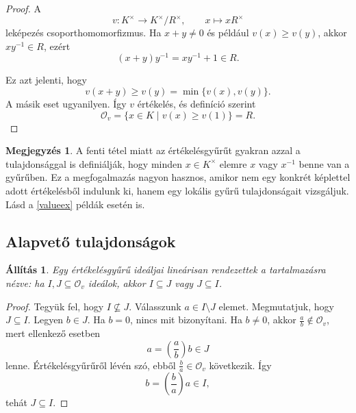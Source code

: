 \documentclass[11pt,a4paper]{article}
\theoremstyle{definition}
\newtheorem{remark}[definition]{Megjegyzés}
\theoremstyle{plain}
\newtheorem{proposition}[definition]{Állítás}
\begin{document}
{\begin{proof}
A
\[
v : K^\times \longrightarrow K^\times / R^\times,
\qquad
x \longmapsto xR^\times
\]
leképezés csoporthomomorfizmus. Ha $x+y\neq 0$ és például
$v(x)\ge v(y)$, akkor $xy^{-1}\in R$, ezért
\[
(x+y)y^{-1}=xy^{-1}+1\in R.
\]

Ez azt jelenti, hogy
\[
v(x+y)\ge v(y)=\min\{v(x),v(y)\}.
\]
A másik eset ugyanilyen. Így $v$ értékelés, és definíció szerint
\[
\mathcal O_v
=
\{x\in K \mid v(x)\ge v(1)\}
=
R.
\]
\end{proof}

\begin{remark}
A fenti tétel miatt az értékelésgyűrűt gyakran azzal a
tulajdonsággal is definiálják, hogy minden $x\in K^\times$ elemre
$x$ vagy $x^{-1}$ benne van a gyűrűben. Ez a megfogalmazás nagyon
hasznos, amikor nem egy konkrét képlettel adott értékelésből
indulunk ki, hanem egy lokális gyűrű tulajdonságait vizsgáljuk. Lásd a \ref{valueex} példák esetén is.
\end{remark}

\subsection{Alapvető tulajdonságok}

\begin{proposition}
Egy értékelésgyűrű ideáljai lineárisan rendezettek a tartalmazásra
nézve: ha $I,J\subseteq \mathcal O_v$ ideálok, akkor
$I\subseteq J$ vagy $J\subseteq I$.
\end{proposition}

\begin{proof}
Tegyük fel, hogy $I\not\subseteq J$. Válasszunk
$a\in I\setminus J$ elemet. Megmutatjuk, hogy $J\subseteq I$.
Legyen $b\in J$. Ha $b=0$, nincs mit bizonyítani.
Ha $b\neq 0$, akkor $\frac{a}{b}\notin \mathcal O_v$, mert ellenkező
esetben
\[
a=(\frac{a}{b})b\in J
\]
lenne. Értékelésgyűrűről lévén szó, ebből
$\frac{b}{a}\in \mathcal O_v$ következik. Így
\[
b=(\frac{b}{a})a\in I,
\]
tehát $J\subseteq I$.
\end{proof}

}
\end{document}
